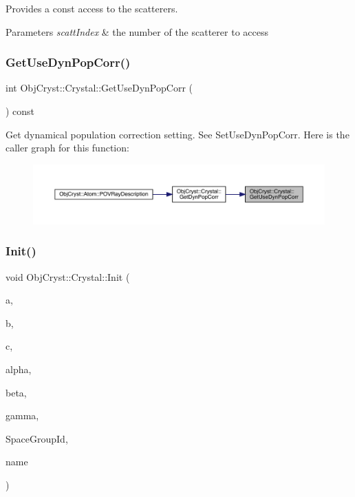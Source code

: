 Provides a const access to the scatterers. 


\begin{DoxyParams}{Parameters}
{\em scatt\+Index} & the number of the scatterer to access \\
\hline
\end{DoxyParams}
\mbox{\label{class_obj_cryst_1_1_crystal_a72737937d045758014fb9ba533c4eba3}} 
\subsubsection{\texorpdfstring{GetUseDynPopCorr()}{GetUseDynPopCorr()}}
{\footnotesize\ttfamily int Obj\+Cryst\+::\+Crystal\+::\+Get\+Use\+Dyn\+Pop\+Corr (\begin{DoxyParamCaption}{ }\end{DoxyParamCaption}) const}

Get dynamical population correction setting. See Set\+Use\+Dyn\+Pop\+Corr. Here is the caller graph for this function\+:
\nopagebreak
\begin{figure}[H]
\begin{center}
\leavevmode
\includegraphics[width=350pt]{class_obj_cryst_1_1_crystal_a72737937d045758014fb9ba533c4eba3_icgraph}
\end{center}
\end{figure}
\mbox{\label{class_obj_cryst_1_1_crystal_aefcd0d1032e5b93de47b4b93d530ed5b}} 
\subsubsection{\texorpdfstring{Init()}{Init()}}
{\footnotesize\ttfamily void Obj\+Cryst\+::\+Crystal\+::\+Init (\begin{DoxyParamCaption}\item[{const R\+E\+AL}]{a,  }\item[{const R\+E\+AL}]{b,  }\item[{const R\+E\+AL}]{c,  }\item[{const R\+E\+AL}]{alpha,  }\item[{const R\+E\+AL}]{beta,  }\item[{const R\+E\+AL}]{gamma,  }\item[{const string \&}]{Space\+Group\+Id,  }\item[{const string \&}]{name }\end{DoxyParamCaption})\hspace{0.3cm}{\ttfamily [virtual]}}



